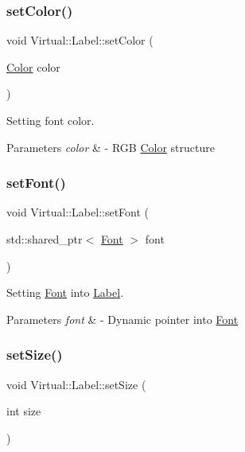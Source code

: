 \subsubsection{\texorpdfstring{set\+Color()}{setColor()}}
{\footnotesize\ttfamily void Virtual\+::\+Label\+::set\+Color (\begin{DoxyParamCaption}\item[{\hyperlink{struct_virtual_1_1_color}{Color}}]{color }\end{DoxyParamCaption})}



Setting font color. 


\begin{DoxyParams}{Parameters}
{\em color} & -\/ R\+GB \hyperlink{struct_virtual_1_1_color}{Color} structure \\
\hline
\end{DoxyParams}
\hypertarget{class_virtual_1_1_label_a643dca9416c60c78b1b1fc234ed6964c}{}\label{class_virtual_1_1_label_a643dca9416c60c78b1b1fc234ed6964c} 
\subsubsection{\texorpdfstring{set\+Font()}{setFont()}}
{\footnotesize\ttfamily void Virtual\+::\+Label\+::set\+Font (\begin{DoxyParamCaption}\item[{std\+::shared\+\_\+ptr$<$ \hyperlink{class_virtual_1_1_font}{Font} $>$}]{font }\end{DoxyParamCaption})}



Setting \hyperlink{class_virtual_1_1_font}{Font} into \hyperlink{class_virtual_1_1_label}{Label}. 


\begin{DoxyParams}{Parameters}
{\em font} & -\/ Dynamic pointer into \hyperlink{class_virtual_1_1_font}{Font} \\
\hline
\end{DoxyParams}
\hypertarget{class_virtual_1_1_label_a20e22a03b54b9851ad675c491df1ae75}{}\label{class_virtual_1_1_label_a20e22a03b54b9851ad675c491df1ae75} 
\subsubsection{\texorpdfstring{set\+Size()}{setSize()}}
{\footnotesize\ttfamily void Virtual\+::\+Label\+::set\+Size (\begin{DoxyParamCaption}\item[{int}]{size }\end{DoxyParamCaption})}



